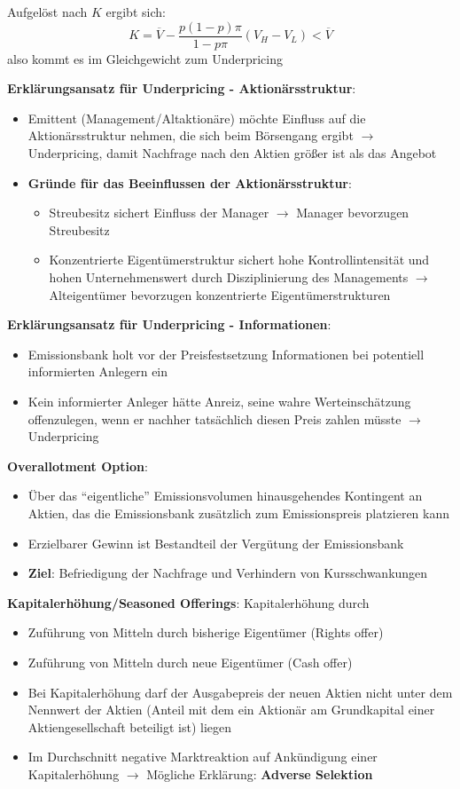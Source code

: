 Aufgelöst nach $K$ ergibt sich: 
$$K=\overline{V}-\frac{p(1-p)\pi}{1-p\pi}(V_H-V_L)<\overline{V}$$
also kommt es im Gleichgewicht zum Underpricing

\textbf{Erklärungsansatz für Underpricing - Aktionärsstruktur}:
\begin{itemize}
	\item Emittent (Management/Altaktionäre) möchte Einfluss auf die Aktionärsstruktur nehmen, die sich beim Börsengang ergibt $\rightarrow$ Underpricing, damit Nachfrage nach den Aktien größer ist als das Angebot
	\item \textbf{Gründe für das Beeinflussen der Aktionärsstruktur}: 
	\begin{itemize}
		\item Streubesitz sichert Einfluss der Manager $\rightarrow$ Manager bevorzugen Streubesitz
		\item Konzentrierte Eigentümerstruktur sichert hohe Kontrollintensität und hohen Unternehmenswert durch Disziplinierung des Managements  $\rightarrow$ Alteigentümer bevorzugen konzentrierte Eigentümerstrukturen
	\end{itemize}
\end{itemize}

\textbf{Erklärungsansatz für Underpricing - Informationen}:
\begin{itemize}
	\item Emissionsbank holt vor der Preisfestsetzung Informationen bei potentiell informierten Anlegern ein
	\item Kein informierter Anleger hätte Anreiz, seine wahre Werteinschätzung offenzulegen, wenn er nachher tatsächlich diesen Preis zahlen müsste $\rightarrow$ Underpricing
\end{itemize}
\bigskip
\textbf{Overallotment Option}: 
\begin{itemize}
	\item Über das \enquote{eigentliche} Emissionsvolumen hinausgehendes Kontingent an Aktien, das die Emissionsbank zusätzlich zum Emissionspreis platzieren kann
	\item Erzielbarer Gewinn ist Bestandteil der Vergütung der Emissionsbank
	\item \textbf{Ziel}: Befriedigung der Nachfrage und Verhindern von Kursschwankungen
\end{itemize}
\bigskip
\textbf{Kapitalerhöhung/Seasoned Offerings}: Kapitalerhöhung durch
\begin{itemize}
	\item Zuführung von Mitteln durch bisherige Eigentümer (Rights offer)
	\item Zuführung von Mitteln durch neue Eigentümer (Cash offer)
	\item Bei Kapitalerhöhung darf der Ausgabepreis der neuen Aktien nicht unter dem Nennwert der Aktien (Anteil mit dem ein Aktionär am Grundkapital einer Aktiengesellschaft beteiligt ist) liegen
	\item Im Durchschnitt negative Marktreaktion auf Ankündigung einer Kapitalerhöhung $\rightarrow$ Mögliche Erklärung: \textbf{Adverse Selektion}
\end{itemize}